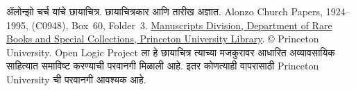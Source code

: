 ॲलोन्झो चर्च यांचे छायाचित्र. छायाचित्रकार आणि तारीख अज्ञात.
Alonzo Church Papers, 1924–1995, (C0948), Box~60, Folder~3.
\href{https://library.princeton.edu/services/special-collections}{Manuscripts
Division, Department of Rare Books and Special Collections, Princeton
University Library}. © Princeton University. Open Logic
Project ला हे छायाचित्र त्याच्या मजकुरावर आधारित अव्यावसायिक
साहित्यात समाविष्ट करण्याची परवानगी मिळाली आहे. इतर कोणत्याही
वापरासाठी Princeton University ची परवानगी आवश्यक आहे.
